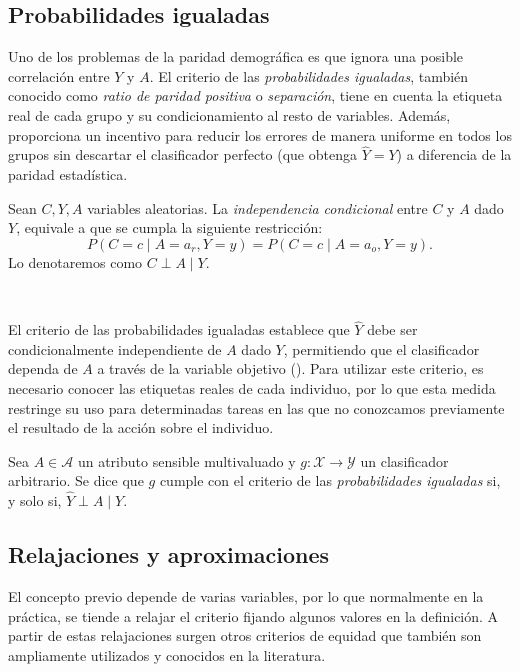 \documentclass[oneside,openright,titlepage,numbers=noenddot,openany,headinclude,footinclude=true,
cleardoublepage=empty,abstractoff,BCOR=5mm,paper=a4,fontsize=12pt,main=spanish]{scrreprt}
\begin{document}
\subsection{Probabilidades igualadas}

Uno de los problemas de la paridad demográfica es que ignora una posible correlación entre $Y$ y $A$. El criterio de las \textit{probabilidades igualadas}, también conocido como \textit{ratio de paridad positiva} o \textit{separación}, tiene en cuenta la etiqueta real de cada grupo y su condicionamiento al resto de variables. Además, proporciona un incentivo para reducir los errores de manera uniforme en todos los grupos sin descartar el clasificador perfecto (que obtenga $\hat{Y}=Y$) a diferencia de la paridad estadística.\\

\begin{definition}
Sean $C,Y,A$ variables aleatorias. La \textit{independencia condicional} entre $C$ y $A$ dado $Y$, equivale a que se cumpla la siguiente restricción:
$$P(C=c \mid A=a_r, Y=y)=P(C=c \mid A=a_o,Y=y).$$
Lo denotaremos como $C \perp A \mid Y.$
\end{definition}\

El criterio de las probabilidades igualadas establece que $\hat{Y}$ debe ser condicionalmente independiente de $A$ dado $Y$, permitiendo que el clasificador dependa de $A$ a través de la variable objetivo (\cite{eodd2016}). Para utilizar este criterio, es necesario conocer las etiquetas reales de cada individuo, por lo que esta medida restringe su uso para determinadas tareas en las que no conozcamos previamente el resultado de la acción sobre el individuo.\\

\begin{definition} \label{def:probigual}
Sea $A \in \mathcal{A}$ un atributo sensible multivaluado y $g\colon \mathcal{X} \to \mathcal{Y}$ un clasificador arbitrario. Se dice que $g$ cumple con el criterio de las \textit{probabilidades igualadas} si, y solo si, $\hat{Y} \perp A \mid Y$.
\end{definition}

\subsection*{Relajaciones y aproximaciones}

El concepto previo depende de varias variables, por lo que normalmente en la práctica, se tiende a relajar el criterio fijando algunos valores en la definición. A partir de estas relajaciones surgen otros criterios de equidad que también son ampliamente utilizados y conocidos en la literatura.
\end{document}
